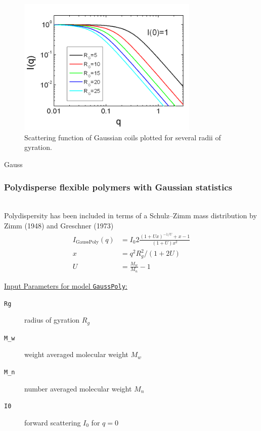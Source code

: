 \begin{figure}[htb]
\begin{center}
\includegraphics[width=0.768\textwidth]{gaussian_coils.png}
\end{center}
\caption{Scattering function of Gaussian coils plotted for several radii of gyration.}
\label{fig:I_gaussian_coils}
\end{figure}

\textcolor[rgb]{1.00,1.00,1.00}{Gauss}\\
\subsubsection{Polydisperse flexible polymers with Gaussian statistics} \cite{Pedersen2002}  \label{sect:GaussPoly}
~\\
Polydispersity has been included in terms of a Schulz–Zimm mass distribution by
Zimm (1948) \cite{zimm:1093}  and Greschner (1973) \cite{Greschner1973}
~\\

\begin{align}
I_\text{GaussPoly}(q) &= I_0 2 \frac{\left( 1+U x\right)^{-1/U}+x-1}{(1+U)x^2} \\
x &= q^2R_g^2/(1+2U) \nonumber \\
U &= \frac{M_w}{M_n} -1 \nonumber
\end{align}

\vspace{5mm}
\underline{Input Parameters for model \texttt{GaussPoly}:}
\begin{description}
\item[\texttt{Rg}] radius of gyration $R_g$
\item[\texttt{M\_w}] weight averaged molecular weight $M_w$
\item[\texttt{M\_n}] number averaged molecular weight $M_n$
\item[\texttt{I0}] forward scattering $I_0$ for $q=0$
\end{description}

